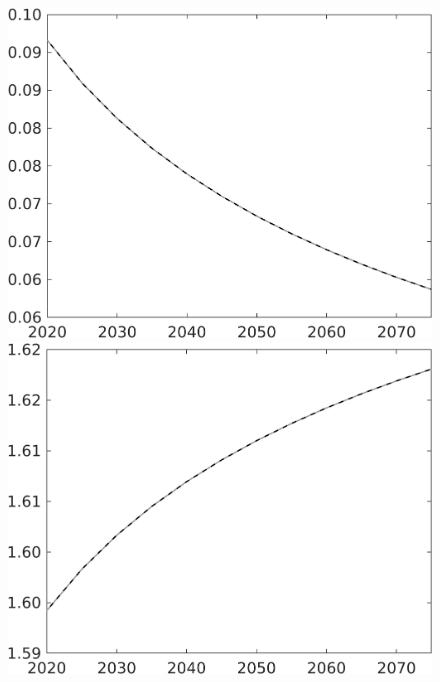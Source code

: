 \documentclass[12pt]{article}
\begin{document}
\begin{figure}[h!!]
\begin{minipage}[]{0.32\textwidth}
	\end{minipage}	
	\begin{minipage}[]{0.32\textwidth}
		\includegraphics[width=1\textwidth]{../../codding_model/own_basedOnFried/optimalPol_010922_revision/figures/all_13Sept22/CompTaul_Equlab_LFBAU_Reg0_pee_spillover0_nsk1_xgr1_knspil0_sep1_countec0_GovRev0_etaa0.79_lgd0.png}
	\end{minipage}	
	\begin{minipage}[]{0.32\textwidth}
		\includegraphics[width=1\textwidth]{../../codding_model/own_basedOnFried/optimalPol_010922_revision/figures/all_13Sept22/CompTaul_Equlab_LFBAU_Reg0_pn_spillover0_nsk1_xgr1_knspil0_sep1_countec0_GovRev0_etaa0.79_lgd0.png}

\end{minipage}
\end{figure}
\end{document}
